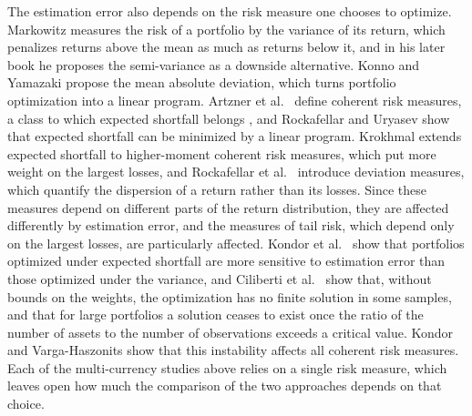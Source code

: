 The estimation error also depends on the risk measure one chooses to optimize. Markowitz
\cite{Markowitz1952} measures the risk of a portfolio by the variance of its return, which penalizes returns above the
mean as much as returns below it, and in his later book \cite{Markowitz1959} he proposes the semi-variance as a downside
alternative. Konno and Yamazaki
\cite{KonnoYamazaki1991} propose the mean absolute deviation, which turns portfolio optimization into a linear program.
Artzner et al.~\cite{CoherentMeasuresOfRisk} define coherent risk measures, a class to which expected shortfall belongs
\cite{acerbi2002coherenceexpectedshortfall}, and Rockafellar and Uryasev \cite{RockafellarUryasev2000,
RockafellarUryasev2002} show that expected shortfall can be minimized by a linear program. Krokhmal \cite{Krokhmal2007}
extends expected shortfall to higher-moment coherent risk measures, which put more weight on the largest losses, and
Rockafellar et al.~\cite{RockafellarUryasevZabarankin2006} introduce deviation measures, which quantify the dispersion of
a return rather than its losses. Since these measures depend on different parts of the return distribution, they are
affected differently by estimation error, and the measures of tail risk, which depend only on the largest losses, are
particularly affected. Kondor et al.~\cite{kondor2007noise} show that portfolios optimized under expected shortfall are
more sensitive to estimation error than those optimized under the variance, and Ciliberti et
al.~\cite{ciliberti2007feasibility} show that, without bounds on the weights, the optimization has no finite solution in
some samples, and that for large portfolios a solution ceases to exist once the ratio of the number of assets to the
number of observations exceeds a critical value. Kondor and Varga-Haszonits \cite{KondorVargaHaszonits2010} show that
this instability affects all coherent risk measures. Each of the multi-currency studies above relies on a single risk measure, which leaves
open how much the comparison of the two approaches depends on that choice.

